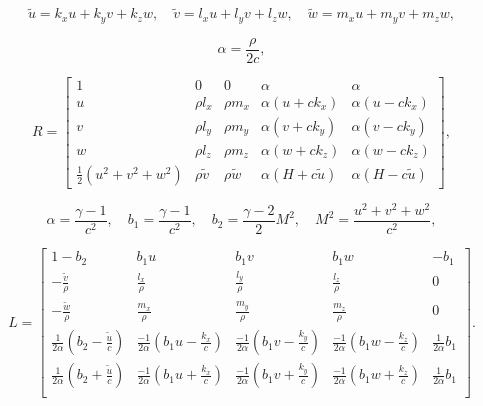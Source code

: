 \documentclass{article}
\begin{document}
\[ \begin{equation*} \tilde{u}=k_x u+k_y v+k_z w, \quad \tilde{v}=l_x u+l_y v+l_z w, \quad \tilde{w}=m_x u+m_y v+m_z w, \end{equation*} \]
\pagebreak

\[ \begin{equation*} \alpha= \frac{\rho}{2c}, \end{equation*} \]
\pagebreak

\[ \begin{equation*} R= \begin{bmatrix} 1 & 0 & 0 & \alpha & \alpha \\ u & \rho l_x& \rho m_x & \alpha (u+c k_x) & \alpha (u-c k_x) \\ v & \rho l_y & \rho m_y & \alpha (v+c k_y) & \alpha (v-c k_y) \\ w & \rho l_z & \rho m_z & \alpha (w+c k_z) & \alpha (w-c k_z) \\ \frac{1}{2}(u^2+v^2+w^2) & \rho \tilde{v} & \rho \tilde{w} &\alpha (H+c \tilde{u}) & \alpha (H-c \tilde{u} ) \end{bmatrix}, \end{equation*} \]
\pagebreak

\[ \begin{equation*} \alpha=\frac{\gamma-1}{c^2}, \quad b_1=\frac{\gamma -1}{c^2}, \quad b_2= \frac{\gamma -2}{2}M^2, \quad M^2=\frac{u^2+v^2+w^2}{c^2}, \end{equation*} \]
\pagebreak

\[ \begin{equation*} L= \begin{bmatrix} 1-b_2 & b_1 u & b_1 v & b_1 w & -b_1 \\ -\frac{\tilde{v}}{\rho} & \frac{l_x}{\rho}& \frac{l_y}{\rho}& \frac{l_z}{\rho} & 0\\ -\frac{\tilde{w}}{\rho} & \frac{m_x}{\rho}& \frac{m_y}{\rho}& \frac{m_z}{\rho} & 0\\ \frac{1}{2\alpha}\left(b_2-\frac{\tilde{u}}{c}\right)& \frac{-1}{2\alpha}\left(b_1u-\frac{k_x}{c}\right)& \frac{-1}{2\alpha}\left(b_1v-\frac{k_y}{c}\right) & \frac{-1}{2\alpha}\left(b_1w-\frac{k_z}{c}\right) & \frac{1}{2\alpha}b_1\\ \frac{1}{2\alpha}\left(b_2+\frac{\tilde{u}}{c}\right)& \frac{-1}{2\alpha}\left(b_1u+\frac{k_x}{c}\right)& \frac{-1}{2\alpha}\left(b_1v+\frac{k_y}{c}\right) & \frac{-1}{2\alpha}\left(b_1w+\frac{k_z}{c}\right) & \frac{1}{2\alpha}b_1\\ \end{bmatrix}. \end{equation*} \]
\pagebreak
\end{document}
